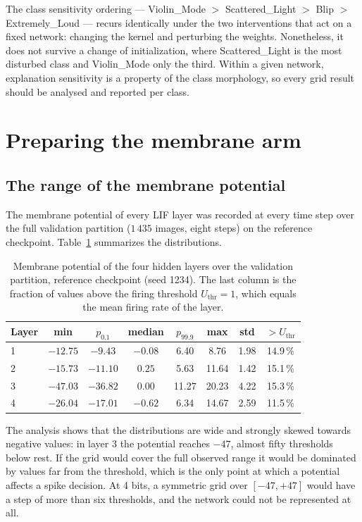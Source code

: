 The class sensitivity ordering --- Violin\_Mode $>$ Scattered\_Light $>$ Blip $>$
Extremely\_Loud --- recurs identically under the two interventions that act on a
fixed network: changing the kernel and perturbing the weights. Nonetheless, it does not
survive a change of initialization, where Scattered\_Light is the most disturbed
class and Violin\_Mode only the third. Within a given
network, explanation sensitivity is a property of the class morphology, so every
grid result should be analysed and reported per class.


\section{Preparing the membrane arm}
\label{sec:membrane-prep}

\subsection{The range of the membrane potential}

The membrane potential of every LIF layer was recorded at every time step over
the full validation partition ($1\,435$ images, eight steps) on the reference
checkpoint. Table~\ref{tab:membrane-range} summarizes the distributions.

\begin{table}[htbp]
\centering
\begin{tabular}{lccccccc}
\toprule
Layer & min & $p_{0.1}$ & median & $p_{99.9}$ & max & std & $> U_{\text{thr}}$ \\
\midrule
1 & $-12.75$ & $-9.43$  & $-0.08$ & 6.40  & 8.76  & 1.98 & 14.9\,\% \\
2 & $-15.73$ & $-11.10$ & $0.25$  & 5.63  & 11.64 & 1.42 & 15.1\,\% \\
3 & $-47.03$ & $-36.82$ & $0.00$  & 11.27 & 20.23 & 4.22 & 15.3\,\% \\
4 & $-26.04$ & $-17.01$ & $-0.62$ & 6.34  & 14.67 & 2.59 & 11.5\,\% \\
\bottomrule
\end{tabular}
\caption{Membrane potential of the four hidden layers over the validation
partition, reference checkpoint (seed 1234). The last column is the fraction of
values above the firing threshold $U_{\text{thr}} = 1$, which equals the mean
firing rate of the layer.}
\label{tab:membrane-range}
\end{table}

The analysis shows that the distributions are wide and strongly skewed towards negative values: in
layer 3 the potential reaches $-47$, almost fifty thresholds below rest. If the grid
would cover the full observed range it would be dominated by values far from the
threshold, which is the only point at which a potential affects a spike
decision. At 4 bits, a symmetric grid over $[-47, +47]$ would have a step of
more than six thresholds, and the network could not be represented at all.

